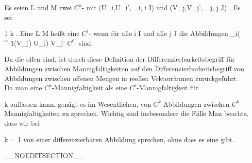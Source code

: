{}
{

Es seien
\mathkor {} {L} {und} {M} {}
zwei $C^k$-
mit
\mathkor {} {(U_i,U_i', \alpha_i, i \in I)} {und} {(V_j,V_j', \beta_j, j \in J)} {.}
Es sei

\mavergleichskette
{\vergleichskette
{ 1
}
{ \leq }{ \ell
}
{ \leq }{ k
}
{    }{
}
{   }{
}
}
{}{}{.}
Eine
\maabbdisp {\varphi} { L } { M
} {}
heißt eine $C^\ell$- wenn für alle
\mathkor {} {i \in I} {und alle} {j \in J} {}
die Abbildungen
 {\alpha_i( \varphi^{-1}(V_j) \cap U_i) } { V_j'
} {}
$C^\ell$-
sind.

}

Da die
 offen sind, ist durch diese Definition der Differenzierbarkeitsbegriff für Abbildungen zwischen Mannigfaltigkeiten auf den Differenzierbarkeitsbegriff von Abbildungen zwischen offenen Mengen in reellen Vektorräumen zurückgeführt. Da man eine $C^k$-Mannigfaltigkeit als eine $C^\ell$-Mannigfaltigkeit für

\mavergleichskette
{\vergleichskette
{ \ell
}
{ \leq }{ k
}
{  }{
}
{    }{
}
{   }{
}
}
{}{}{}
auffassen kann, genügt es im Wesentlichen, von $C^k$-Abbildungen zwischen $C^k$-Mannigfaltigkeiten zu sprechen. Wichtig sind insbesondere die Fälle
 Man beachte, dass wir bei

\mavergleichskette
{\vergleichskette
{ k
}
{ = }{ 1
}
{  }{
}
{    }{
}
{   }{
}
}
{}{}{}
von einer differenzierbaren Abbildung sprechen, ohne dass es
 {} {}
eine  gibt.

__NOEDITSECTION__

